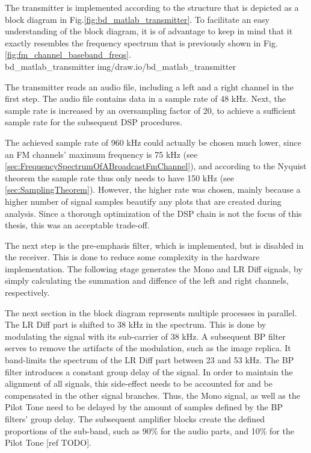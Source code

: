 The transmitter is implemented according to the structure that is depicted as a block diagram in Fig.\ref{fig:bd_matlab_transmitter}.
To facilitate an easy understanding of the block diagram, it is of advantage to keep in mind that it exactly resembles the frequency spectrum that is previously shown in Fig.\ref{fig:fm_channel_baseband_freqs}.\\

 {bd_matlab_transmitter} {img/draw.io/bd_matlab_transmitter}

The transmitter reads an audio file, including a left and a right channel in the first step.
The audio file contains data in a sample rate of 48 kHz.
Next, the sample rate is increased by an oversampling factor of 20, to achieve a sufficient sample rate for the subsequent DSP procedures.

The achieved sample rate of 960 kHz could actually be chosen much lower, since an FM channels' maximum frequency is 75 kHz (see \ref{sec:FrequencySpectrumOfABroadcastFmChannel}), and according to the Nyquist theorem the sample rate thus only needs to have 150 kHz (see \ref{sec:SamplingTheorem}).
However, the higher rate was chosen, mainly because a higher number of signal samples beautify any plots that are created during analysis.
Since a thorough optimization of the DSP chain is not the focus of this thesis, this was an acceptable trade-off.

The next step is the pre-emphasis filter, which is implemented, but is disabled in the receiver.
This is done to reduce some complexity in the hardware implementation.
The following stage generates the Mono and LR Diff signals, by simply calculating the summation and diffence of the left and right channels, respectively.

The next section in the block diagram represents multiple processes in parallel.
The LR Diff part is shifted to 38 kHz in the spectrum.
This is done by modulating the signal with its sub-carrier of 38 kHz.
A subsequent BP filter serves to remove the artifacts of the modulation, such as the image replica.
It band-limits the spectrum of the LR Diff part between 23 and 53 kHz.
The BP filter introduces a constant group delay of the signal.
In order to maintain the alignment of all signals, this side-effect needs to be accounted for and be compensated in the other signal branches.
Thus, the Mono signal, as well as the Pilot Tone need to be delayed by the amount of samples defined by the BP filters' group delay.
The subsequent amplifier blocks create the defined proportions of the sub-band, such as 90\% for the audio parts, and 10\% for the Pilot Tone [ref TODO].

